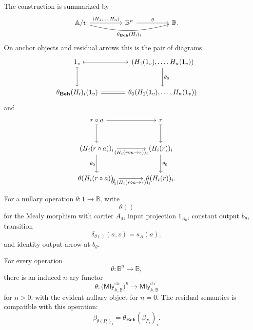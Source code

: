 The construction is summarized by
\[
\begin{tikzcd}[column sep=huge, row sep=large]
    \mathbb A/v
        \arrow[r, "{\langle H_1,\dots,H_n\rangle}"]
        \arrow[rr, "{\theta_{\mathbf{Beh}}(H_i)_i}"', bend right=14]
    &
    \mathbb B^n
        \arrow[r, "\theta"]
    &
    \mathbb B .
\end{tikzcd}
\]
On anchor objects and residual arrows this is the pair of diagrams
\[
\begin{tikzcd}[column sep=large, row sep=large]
    1_v
        \arrow[r, maps to]
        \arrow[d, maps to]
    &
    (H_1(1_v),\dots,H_n(1_v))
        \arrow[d, "\theta_0"]
    \\
    \theta_{\mathbf{Beh}}(H_i)_i(1_v)
        \arrow[r, equal]
    &
    \theta_0(H_1(1_v),\dots,H_n(1_v))
\end{tikzcd}
\]
and
\[
\begin{tikzcd}[column sep=large, row sep=large]
    r\circ a
        \arrow[r]
        \arrow[d, maps to]
    &
    r
        \arrow[d, maps to]
    \\
    (H_i(r\circ a))_i
        \arrow[r, "{(H_i(r\circ a\to r))_i}"']
        \arrow[d, "\theta_0"']
    &
    (H_i(r))_i
        \arrow[d, "\theta_0"]
    \\
    \theta(H_i(r\circ a))_i
        \arrow[r, "{\theta_1(H_i(r\circ a\to r))_i}"']
    &
    \theta(H_i(r))_i .
\end{tikzcd}
\]

For a nullary operation \(\theta:1\to\mathbb B\), write
\[
    \theta()
\]
for the Mealy morphism with carrier \(A_0\), input projection \(1_{A_0}\),
constant output \(b_\theta\), transition
\[
    \delta_{\theta()}(a,v)=s_A(a),
\]
and identity output arrow at \(b_\theta\).

\begin{lemma}
\label{lem:structured-operations-semantic}
    For every operation
    \[
        \theta:\mathbb B^n\to\mathbb B,
    \]
    there is an induced \(n\)-ary functor
    \[
        \theta:
        \bigl(\mathsf{Mly}^{\mathrm{str}}_{\mathbb A,\mathbb B}\bigr)^n
        \to
        \mathsf{Mly}^{\mathrm{str}}_{\mathbb A,\mathbb B}
    \]
    for \(n>0\), with the evident nullary object for \(n=0\). The residual
    semantics is compatible with this operation:
    \[
        \beta_{\theta(P_i)_i}
        =
        \theta_{\mathbf{Beh}}(\beta_{P_i})_i.
    \]
\end{lemma}

